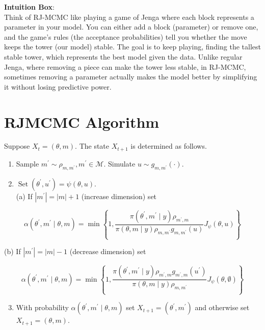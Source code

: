 \documentclass[10pt]{article}
\begin{document}
\textbf{Intuition Box}:\\
Think of RJ-MCMC like playing a game of Jenga where each block represents a parameter in your model. You can either add a block (parameter) or remove one, and the game's rules (the acceptance probabilities) tell you whether the move keeps the tower (our model) stable. The goal is to keep playing, finding the tallest stable tower, which represents the best model given the data. Unlike regular Jenga, where removing a piece can make the tower less stable, in RJ-MCMC, sometimes removing a parameter actually makes the model better by simplifying it without losing predictive power.

\section*{RJMCMC Algorithm}
Suppose $X_t=(\theta, m)$. The state $X_{t+1}$ is determined as follows.

\begin{enumerate}
  \item Sample $m^{\prime} \sim \rho_{m, m^{\prime}}, m^{\prime} \in \mathcal{M}$. Simulate $u \sim g_{m, m^{\prime}}(\cdot)$.
  \item $\operatorname{Set}\left(\theta^{\prime}, u^{\prime}\right)=\psi(\theta, u)$.\\
(a) If $\left|m^{\prime}\right|=|m|+1$ (increase dimension) set
\end{enumerate}

$$
\alpha\left(\theta^{\prime}, m^{\prime} \mid \theta, m\right)=\min \left\{1, \frac{\pi\left(\theta^{\prime}, m^{\prime} \mid y\right) \rho_{m^{\prime}, m}}{\pi(\theta, m \mid y) \rho_{m, m^{\prime}} g_{m, m^{\prime}}(u)} J_\psi(\theta, u)\right\}
$$

(b) If $\left|m^{\prime}\right|=|m|-1$ (decrease dimension) set

$$
\alpha\left(\theta^{\prime}, m^{\prime} \mid \theta, m\right)=\min \left\{1, \frac{\pi\left(\theta^{\prime}, m^{\prime} \mid y\right) \rho_{m^{\prime}, m} g_{m^{\prime}, m}\left(u^{\prime}\right)}{\pi(\theta, m \mid y) \rho_{m, m^{\prime}}} J_\psi(\theta, \emptyset)\right\}
$$

\begin{enumerate}
  \setcounter{enumi}{2}
  \item With probability $\alpha\left(\theta^{\prime}, m^{\prime} \mid \theta, m\right)$ set $X_{t+1}=\left(\theta^{\prime}, m^{\prime}\right)$ and otherwise set $X_{t+1}=(\theta, m)$.
\end{enumerate}
\end{document}
